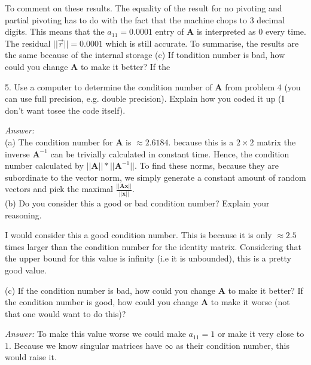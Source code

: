 \documentclass{article}
\begin{document}
    To comment on these results. The equality of the result for no pivoting and
    partial pivoting has to do with the fact that the machine chops to 3 decimal digits.
    This means that the $a_{11} = 0.0001$ entry of $\bm{A}$ is interpreted as $0$
    every time. The residual $||\vec{r}|| = 0.0001$ which is still accurate.
    To summarise, the results are the same because of the internal storage
    (c) If tondition number is bad, how could you change $\bm{A}$ to make it better? If the 

    \vspace{1cm}
    5. Use a computer to determine the condition number of $\bm{A}$ from problem 4 
    (you can use full precision, e.g. double precision).  Explain how you coded it up 
    (I don’t want tosee the code itself).
    
    \vspace{0.5cm}
    \textit{Answer:} \\
    (a) The condition number for $\bm{A}$ is $\approx 2.6184$.
    because this is a $2\times 2$ matrix the inverse $\bm{A}^{-1}$ can be trivially
    calculated in constant time. Hence, the condition number calculated by
    $||\bm{A}||*||\bm{A}^{-1}||$. To find these norms, because they are subordinate
    to the vector norm, we simply generate a constant amount of random vectors and 
    pick the maximal $\frac{||\bm{A}\bm{x}||}{||\bm{x}||}$. \\
    (b) Do you consider this a good or bad condition number?
    Explain your reasoning.

    \vspace{0.5cm}
    I would consider this a good condition number. This is because it is only $\approx 2.5$
    times larger than the condition number for the identity matrix. Considering that the
    upper bound for this value is infinity (i.e it is unbounded), this is a pretty good value.

    \vspace{1cm}
    (c) If the condition number is bad, how could you change $\bm{A}$ to make it better? If the 
    condition number is good, how could you change $\bm{A}$ to make it worse (not that one 
    would want to do this)?

    \vspace{0.5cm}
    \textit{Answer:} To make this value worse we could make $a_{11} = 1$ or make 
    it very close to $1$. Because we know singular matrices have $\infty$ as their condition
    number, this would raise it. 
\end{document}
